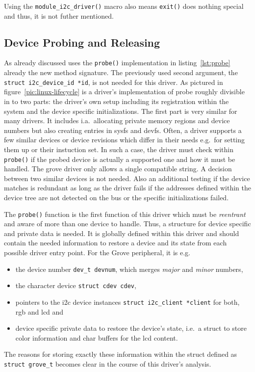 Using the \texttt{module_i2c_driver()} macro also means \texttt{exit()} does nothing special and thus, it is not futher mentioned.

\subsection{Device Probing and Releasing}
As already discussed uses the \texttt{probe()} implementation in listing~\ref{lst:probe} already the new method signature.
The previously used second argument, the \texttt{struct i2c_device_id *id}, is not needed for this driver.
As pictured in figure~\ref{pic:linux-lifecycle} is a driver's implementation of probe roughly divisible in to two parts: the driver's own setup including its registration within the system and the device specific initializations.
The first part is very similar for many drivers.
It includes i.a.\ allocating private memory regions and device numbers but also creating entries in sysfs and devfs.
Often, a driver supports a few similar devices or device revisions which differ in their needs e.g.\ for setting them up or their instuction set.
In such a case, the driver must check within \texttt{probe()} if the probed device is actually a supported one and how it must be handled.
The grove driver only allows a single compatible string.
A decision between two similar devices is not needed.
Also an additional testing if the device matches is redundant as long as the driver fails if the addresses defined within the device tree are not detected on the bus or the specific initializations failed.

The \texttt{probe()} function is the first function of this driver which must be \textit{reentrant} and aware of more than one device to handle.
Thus, a structure for device specific and private data is needed.
It is globally defined within this driver and should contain the needed information to restore a device and its state from each possible driver entry point.
For the Grove peripheral, it is e.g.\ 
\begin{itemize}
    \item the device number \texttt{dev_t devnum}, which merges \textit{major} and \textit{minor} numbers,
    \item the character device \texttt{struct cdev cdev},
    \item pointers to the \ac{i2c} device instances \texttt{struct i2c_client *client} for both, \ac{rgb} and \ac{lcd} and 
    \item device specific private data to restore the device's state, i.e.\ a struct to store color information and char buffers for the \ac{lcd} content.
\end{itemize}
The reasons for storing exactly these information within the struct defined as \texttt{struct grove_t} becomes clear in the course of this driver's analysis.

